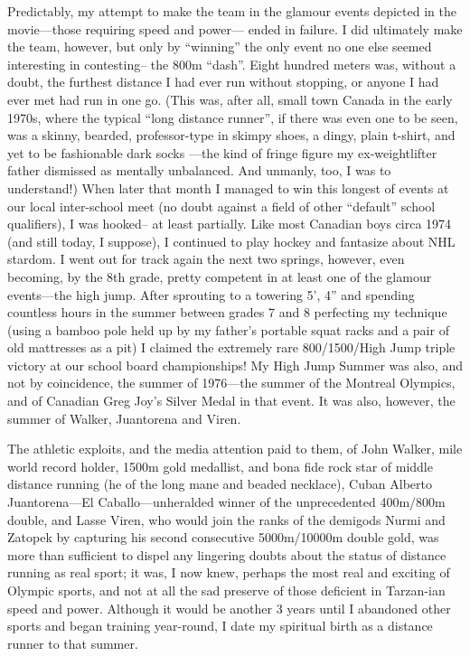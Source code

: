 Predictably, my attempt to make the team in the glamour events depicted in the movie—those requiring speed and power— ended in failure. I did ultimately make the team, however, but only by “winning” the only event no one else seemed interesting in contesting-- the 800m “dash”. Eight hundred meters was, without a doubt, the furthest distance I had ever run without stopping, or anyone I had ever met had run in one go. (This was, after all, small town Canada in the early 1970s, where the typical “long distance runner”, if there was even one to be seen, was a skinny, bearded, professor-type in skimpy shoes, a dingy, plain t-shirt, and yet to be fashionable dark socks —the kind of fringe figure my ex-weightlifter father dismissed as mentally unbalanced. And unmanly, too, I was to understand!) When later that month I managed to win this longest of events at our local inter-school meet (no doubt against a field of other “default” school qualifiers), I was hooked-- at least partially. Like most Canadian boys circa 1974 (and still today, I suppose), I continued to play hockey and fantasize about NHL stardom. I went out for track again the next two springs, however, even becoming, by the 8th grade, pretty competent in at least one of the glamour events—the high jump. After sprouting to a towering 5’, 4” and spending countless hours in the summer between grades 7 and 8 perfecting my technique (using a bamboo pole held up by my father’s portable squat racks and a pair of old mattresses as a pit) I claimed the extremely rare 800/1500/High Jump triple victory at our school board championships! My High Jump Summer was also, and not by coincidence, the summer of 1976—the summer of the Montreal Olympics, and of Canadian Greg Joy’s Silver Medal in that event. It was also, however, the summer of Walker, Juantorena and Viren.


The athletic exploits, and the media attention paid to them, of John Walker, mile world record holder, 1500m gold medallist, and bona fide rock star of middle distance running (he of the long mane and beaded necklace), Cuban Alberto Juantorena—El Caballo—unheralded winner of the unprecedented 400m/800m double, and Lasse Viren, who would join the ranks of the demigods Nurmi and Zatopek by capturing his second consecutive 5000m/10000m double gold, was more than sufficient to dispel any lingering doubts about the status of distance running as real sport; it was, I now knew, perhaps the most real and exciting of Olympic sports, and not at all the sad preserve of those deficient in Tarzan-ian speed and power. Although it would be another 3 years until I abandoned other sports and began training year-round, I date my spiritual birth as a distance runner to that summer.


